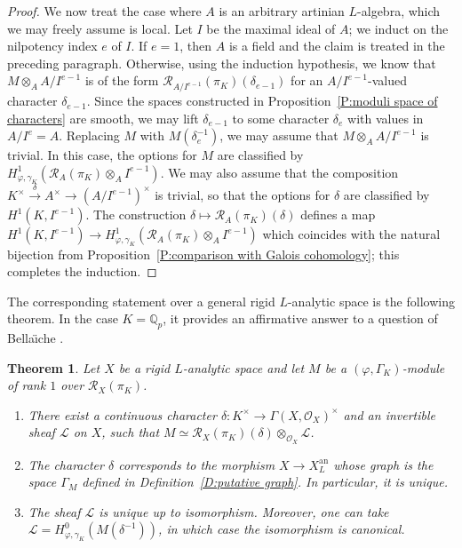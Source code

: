 \documentclass[12pt]{article}
\newtheorem{theorem}{Theorem}[subsection]
\theoremstyle{definition}
\numberwithin{equation}{theorem}
\newcommand{\calL}{\mathcal{L}}
\newcommand{\calO}{\mathcal{O}}
\newcommand{\calR}{\mathcal{R}}
\newcommand{\QQ}{\mathbb{Q}}
\newcommand{\an}{\mathrm{an}}
\def\Qp{\QQ_p}
\begin{document}
\begin{proof}
We now treat the case where $A$ is an arbitrary artinian
$L$-algebra, which we may freely assume is local.  Let $I$ be the maximal ideal of $A$; we induct on the
nilpotency index $e$ of $I$.  If $e=1$, then $A$ is a field and the
claim is treated in the preceding paragraph.  Otherwise, using the
induction hypothesis, we know that $M \otimes_A A/I^{e-1}$ is of the
form $\calR_{A/I^{e-1}}(\pi_K)(\delta_{e-1})$ for an
$A/I^{e-1}$-valued character $\delta_{e-1}$.  Since the spaces
constructed in Proposition~\ref{P:moduli space of characters} are smooth, we may
lift $\delta_{e-1}$ to some character $\delta_e$ with values in $A/I^e
= A$.  Replacing $M$ with $M(\delta_e^{-1})$, we may assume that $M
\otimes_A A/I^{e-1}$ is trivial.  In this case, the options for $M$
are classified by $H^1_{\varphi, \gamma_K}(\calR_A(\pi_K) \otimes_A
I^{e-1})$.  We may also assume that the composition $K^\times
\stackrel{\delta}{\to} A^\times \to (A/I^{e-1})^\times$ is trivial, so
that the options for $\delta$ are classified by $H^1(K, I^{e-1})$.
The construction $\delta \mapsto \calR_A(\pi_K)(\delta)$ defines a map
$H^1(K, I^{e-1}) \to H^1_{\varphi, \gamma_K}(\calR_A(\pi_K) \otimes_A
I^{e-1})$ which coincides with the natural bijection from
Proposition~\ref{P:comparison with Galois cohomology}; this completes
the induction.
\end{proof}

The corresponding statement over a general rigid $L$-analytic space is
the following theorem. In the case $K = \Qp$, it provides an affirmative answer to a question of Bella\"\i che \cite[\S 3, Question 1]{R:Bellaiche}. 

\begin{theorem} \label{T:full rank 1 classification}
Let $X$ be a rigid $L$-analytic space
and let $M$ be a $(\varphi, \Gamma_K)$-module of rank $1$ over $\calR_X(\pi_K)$.
\begin{enumerate}
\item[(1)]
There exist a continuous character $\delta: K^\times \to \Gamma(X, \calO_X)^\times$ and an invertible sheaf $\calL$ on $X$, such that $M \simeq \calR_X(\pi_K)(\delta) \otimes_{\calO_X} \calL$. 
\item[(2)]
The character $\delta$ corresponds to the morphism $X \to X^{\an}_L$
whose graph is the space $\Gamma_M$ defined in Definition~\ref{D:putative graph}. In particular, it is unique.
\item[(3)]
The sheaf $\calL$ is unique up to isomorphism.
Moreover, one can take $\calL = H^0_{\varphi, \gamma_K}(M(\delta^{-1}))$, in which case the isomorphism is canonical.
\end{enumerate}
\end{theorem}
\end{document}
